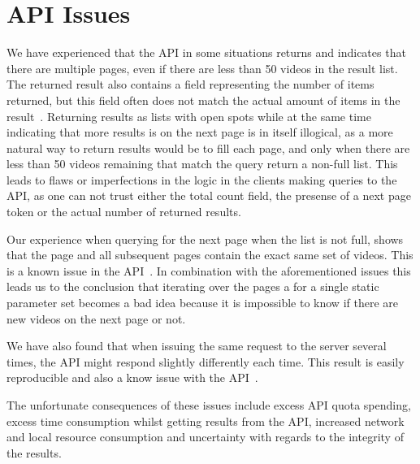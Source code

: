 \section{API Issues}
We have experienced that the API in some situations returns and indicates that
there are multiple pages, even if there are less than 50 videos in the result
list. The returned result also contains a field representing the number of items
returned, but this field often does not match the actual amount of items in the 
result~\cite[Issue 5173]{conclusion:gdataissue}. Returning results as lists with
open spots while at the same time indicating that more results is on the next
page is in itself illogical, as a more natural way to return results would be to
fill each page, and only when there are less than 50 videos remaining that match
the query return a non-full list. This leads to flaws or imperfections in the 
logic in the clients making queries to the API, as one can not trust either the
total count field, the presense of a next page token or the actual number of
returned results.

Our experience when querying for the next page when the list is not full, shows
that the page and all subsequent pages contain the exact same set of videos. 
This is a known issue in the API~\cite[Issue 6406]{conclusion:gdataissue}. In 
combination with the aforementioned issues this leads us to the conclusion that 
iterating over the pages a for a single static parameter set becomes a bad 
idea because it is impossible to know if there are new videos on the next page 
or not.

We have also found that when issuing the same request to the server several
times, the API might respond slightly differently each time. This result is
easily reproducible and also a know issue with the 
API~\cite[Issue 4275]{conclusion:gdataissue}. 

The unfortunate consequences of these issues include excess API quota spending,
excess time consumption whilst getting results from the API, increased network
and local resource consumption and uncertainty with regards to the integrity of
the results. 

